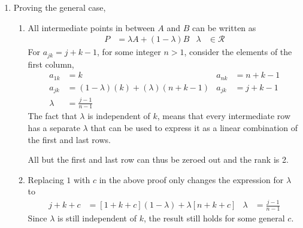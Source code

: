 \begin{enumerate}
\begin{align}
\begin{bNiceMatrix}[r, margin]
\vec{v}_1 \\ \vec{v}_2 \\
\vec{v}_3 \\
\end{bNiceMatrix}          & = \begin{bNiceMatrix}[r, margin]
9 & 0 & 1 & 0 \\
0 & 9 & 8 & 9 \\
0 & 0 & 1 & 0
\end{bNiceMatrix} &
\begin{bNiceMatrix}[r, margin]
\vec{u}_1 & \vec{u}_2 & \vec{u}_3
\end{bNiceMatrix} & = \begin{bNiceMatrix}[r, margin]
9 & 0 & 0 \\
0 & 9 & 0 \\
1 & 8 & 1 \\
0 & 9 & 0
\end{bNiceMatrix}
\end{align}

\item Proving the general case,
\begin{enumerate}
    \item All intermediate points in between $ A $ and $ B $ can be written
          as
          \begin{align}
              P & = \lambda A + (1 - \lambda) B & \lambda & \in \mathcal{R}
          \end{align}
          For $ a_{jk} = j + k - 1 $, for some integer $ n > 1 $, consider the
          elements of the first column,
          \begin{align}
              a_{1k}  & = k                                   &
              a_{nk}  & = n + k - 1                             \\
              a_{jk}  & = (1 - \lambda)(k) + (\lambda)(n+k-1) &
              a_{jk}  & = j+k-1                                 \\
              \lambda & = \frac{j - 1}{n-1}
          \end{align}
          The fact that $ \lambda $ is independent of $ k $, means that every
          intermediate row has a separate $ \lambda $ that can be used to
          express it as a linear combination of the first and last rows. \par
          All but the first and last row can thus be zeroed out and the rank
          is 2. \par

    \item Replacing $ 1 $ with $ c $ in the above proof only changes
          the expression for $ \lambda $ to
          \begin{align}
              j + k + c & = [1 + k + c](1 - \lambda) + \lambda[n+k+c] &
              \lambda   & = \frac{j - 1}{n-1}
          \end{align}
          Since $ \lambda $ is still independent of $ k $, the result still
          holds for some general $ c $.


\end{enumerate}
\end{enumerate}
